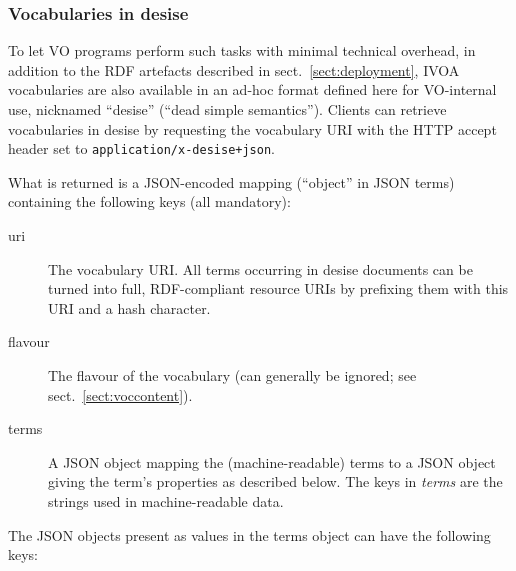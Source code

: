 \documentclass[11pt,a4paper]{ivoa}
\begin{document}
\subsubsection{Vocabularies in desise}

To let VO programs perform such tasks with minimal technical overhead,
in addition to the RDF artefacts described in
sect.~\ref{sect:deployment}, IVOA vocabularies are also available in an
ad-hoc format defined here for VO-internal use, nicknamed ``desise''
(``dead simple semantics'').  Clients can retrieve vocabularies in
desise by requesting the vocabulary URI with the HTTP accept header set
to \texttt{application/x-desise+json}.

What is returned is a JSON-encoded \citep{std:JSON} mapping (``object''
in JSON terms)
containing the following keys (all mandatory):

\begin{description}
\item[uri] The vocabulary URI.  All terms occurring in desise documents
can be turned into full, RDF-compliant resource URIs by prefixing them
with this URI and a hash character.
\item[flavour] The flavour of the vocabulary (can generally be ignored;
see sect.~\ref{sect:voccontent}).

\item[terms] A JSON object mapping the (machine-readable) terms to a
JSON object giving the term's properties as described below.
The keys in \textit{terms} are the strings used in
machine-readable data.
\end{description}

The JSON objects present as values in the terms object can have the
following keys:
\end{document}
